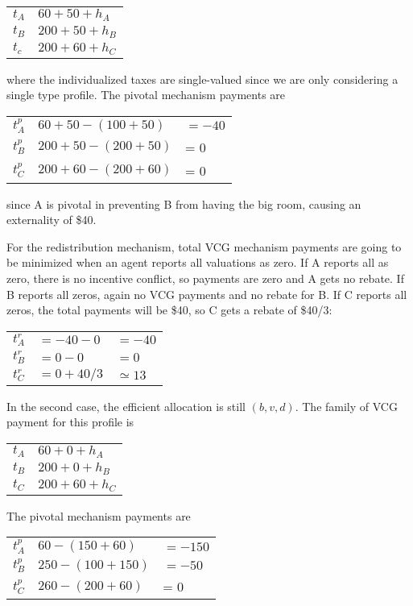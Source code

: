 \documentclass[letter, 10pt]{article}
\theoremstyle{basic}
\begin{document}
\begin{spacing}{1.0}
\begin{enumerate}
  \begin{tabular}{ll}
    $t_A$ & $60 + 50 + h_A$ \\
    $t_B$ & $200 + 50 + h_B$ \\
    $t_c$ & $200 + 60 + h_C$
  \end{tabular}

  where the individualized taxes are single-valued since we are only
  considering a single type profile. The pivotal mechanism payments are

  \begin{tabular}{lll}
    $t_A^p$ & $60 + 50  - (100 + 50)$ & $= -40$ \\
    $t_B^p$ & $200 + 50 - (200 + 50)$ &= 0 \\
    $t_C^p$ & $200 + 60 - (200 + 60)$ &= 0
  \end{tabular}

  since A is pivotal in preventing B from having the big room, causing an
  externality of \$40.

  For the redistribution mechanism, total VCG mechanism payments are going
  to be minimized when an agent reports all valuations as zero. If A
  reports all as zero, there is no incentive conflict, so payments are
  zero and A gets no rebate. If B reports all zeros, again no VCG payments
  and no rebate for B. If C reports all zeros, the total payments will
  be \$40, so C gets a rebate of \$40/3:

  \begin{tabular}{lll}
    $t_A^r$ & $= -40 - 0$ & $=-40$ \\
    $t_B^r$ & $= 0 - 0$ & $=0$ \\
    $t_C^r$ & $= 0 + 40/3$ & $\simeq 13$
  \end{tabular}

  In the second case, the efficient allocation is still $(b, v, d)$. The
  family of VCG payment for this profile is

  \begin{tabular}{ll}
    $t_A$ & $60 + 0 + h_A$ \\
    $t_B$ & $200 + 0 + h_B$ \\
    $t_C$ & $200 + 60 + h_C$
  \end{tabular}

  The pivotal mechanism payments are

  \begin{tabular}{lll}
    $t_A^p$ & $60 - (150 + 60)$ & $= -150$ \\
    $t_B^p$ & $250 - (100 + 150)$ & $= -50$ \\
    $t_C^p$ & $260 - (200 + 60)$ &= 0
  \end{tabular}


\end{enumerate}
\end{spacing}
\end{document}

